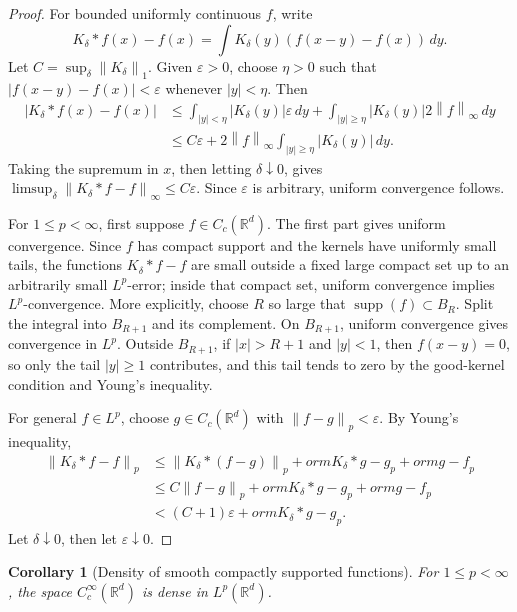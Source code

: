\documentclass[11pt,openany]{book}
\numberwithin{equation}{chapter}
\theoremstyle{definition}
\theoremstyle{plain}
\newtheorem{corollary}[definition]{Corollary}
\theoremstyle{remark}
\newcommand{\R}{\mathbb{R}}
\newcommand{\eps}{\varepsilon}
\newcommand{\1}{\mathbf{1}}
\newcommand{\dd}{\,d}
\newcommand{\abs}[1]{\left\lvert #1\right\rvert}
\newcommand{\norm}[1]{\left\lVert #1\right\rVert}
\newcommand{\supp}{\operatorname{supp}}
\begin{document}
\begin{proof}
For bounded uniformly continuous \(f\), write
\[
    K_\delta*f(x)-f(x)=\int K_\delta(y)(f(x-y)-f(x))\dd y.
\]
Let \(C=\sup_\delta\norm{K_\delta}_1\).  Given \(\eps>0\), choose \(\eta>0\) such that \(\abs{f(x-y)-f(x)}<\eps\) whenever \(\abs y<\eta\).  Then
\[
\begin{aligned}
\abs{K_\delta*f(x)-f(x)}
&\le \int_{\abs y<\eta}\abs{K_\delta(y)}\eps\dd y
+\int_{\abs y\ge\eta}\abs{K_\delta(y)}2\norm f_\infty\dd y\\
&\le C\eps+2\norm f_\infty\int_{\abs y\ge\eta}\abs{K_\delta(y)}\dd y.
\end{aligned}
\]
Taking the supremum in \(x\), then letting \(\delta\downarrow0\), gives \(\limsup_\delta\norm{K_\delta*f-f}_\infty\le C\eps\).  Since \(\eps\) is arbitrary, uniform convergence follows.

For \(1\le p<\infty\), first suppose \(f\in C_c(\R^d)\).  The first part gives uniform convergence.  Since \(f\) has compact support and the kernels have uniformly small tails, the functions \(K_\delta*f-f\) are small outside a fixed large compact set up to an arbitrarily small \(L^p\)-error; inside that compact set, uniform convergence implies \(L^p\)-convergence.  More explicitly, choose \(R\) so large that \(\supp(f)\subset B_R\).  Split the integral into \(B_{R+1}\) and its complement.  On \(B_{R+1}\), uniform convergence gives convergence in \(L^p\).  Outside \(B_{R+1}\), if \(\abs{x}>R+1\) and \(\abs{y}<1\), then \(f(x-y)=0\), so only the tail \(\abs y\ge1\) contributes, and this tail tends to zero by the good-kernel condition and Young's inequality.

For general \(f\in L^p\), choose \(g\in C_c(\R^d)\) with \(\norm{f-g}_p<\eps\).  By Young's inequality,
\[
\begin{aligned}
\norm{K_\delta*f-f}_p
&\le \norm{K_\delta*(f-g)}_p+
orm{K_\delta*g-g}_p+
orm{g-f}_p\\
&\le C\norm{f-g}_p+
orm{K_\delta*g-g}_p+
orm{g-f}_p\\
&< (C+1)\eps+
orm{K_\delta*g-g}_p.
\end{aligned}
\]
Let \(\delta\downarrow0\), then let \(\eps\downarrow0\).
\end{proof}

\begin{corollary}[Density of smooth compactly supported functions]
For \(1\le p<\infty\), the space \(C_c^\infty(\R^d)\) is dense in \(L^p(\R^d)\).
\end{corollary}
\end{document}
